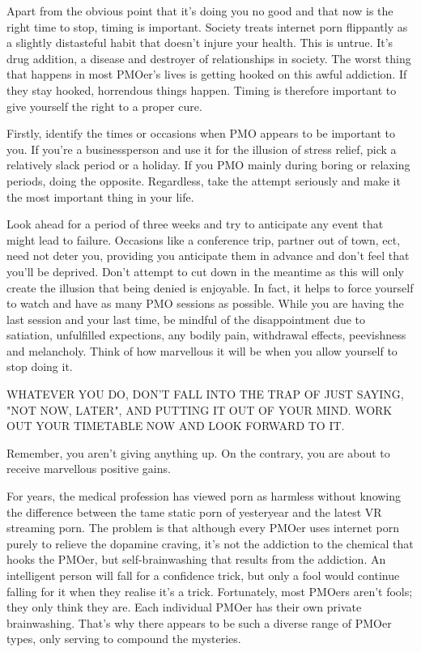 \documentclass[easypeasy.tex]{subfiles}
\begin{document}
Apart from the obvious point that it's doing you no good and that now is the right time to stop, timing is important. Society treats internet porn flippantly as a slightly distasteful habit that doesn't injure your health. This is untrue. It's  drug addition, a disease and destroyer of relationships in society. The worst thing that happens in most PMOer's lives is getting hooked on this awful addiction. If they stay hooked, horrendous things happen. Timing is therefore important to give yourself the right to a proper cure.

Firstly, identify the times or occasions when PMO appears to be important to you. If you're a businessperson and use it for the illusion of stress relief, pick a relatively slack period or a holiday. If you PMO mainly during boring or relaxing periods, doing the opposite. Regardless, take the attempt seriously and make it the most important thing in your life.

Look ahead for a period of three weeks and try to anticipate any event that might lead to failure. Occasions like a conference trip, partner out of town, ect, need not deter you, providing you anticipate them in advance and don't feel that you'll be deprived. Don't attempt to cut down in the meantime as this will only create the illusion that being denied is enjoyable. In fact, it helps to force yourself to watch and have as many PMO sessions as possible. While you are having the last session and your last time, be mindful of the disappointment due to satiation, unfulfilled expections, any bodily pain, withdrawal effects, peevishness and melancholy. Think of how marvellous it will be when you allow yourself to stop doing it.

{\huge WHATEVER YOU DO, DON'T FALL INTO THE TRAP OF JUST SAYING, "NOT NOW, LATER", AND PUTTING IT OUT OF YOUR MIND. WORK OUT YOUR TIMETABLE NOW AND LOOK FORWARD TO IT.}

Remember, you aren't giving anything up. On the contrary, you are about to receive marvellous positive gains.

For years, the medical profession has viewed porn as harmless without knowing the difference between the tame static porn of yesteryear and the latest VR streaming porn. The problem is that although every PMOer uses internet porn purely to relieve the dopamine craving, it's not the addiction to the chemical that hooks the PMOer, but self-brainwashing that results from the addiction. An intelligent person will fall for a confidence trick, but only a fool would continue falling for it when they realise it's a trick. Fortunately, most PMOers aren't fools; they only think they are. Each individual PMOer has their own private brainwashing. That's why there appears to be such a diverse range of PMOer types, only serving to compound the mysteries.
\end{document}
